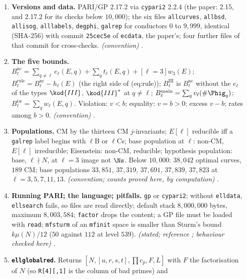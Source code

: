 \begin{enumerate}[label=\textbf{\thechapter.\arabic*}]
\item \textbf{Versions and data.} PARI/GP 2.17.2 via \texttt{cypari2} 2.2.4 (the paper: 2.15, and 2.17.2 for its checks below $10{,}000$); the six files
\texttt{allcurves}, \texttt{allbsd}, \texttt{allisog}, \texttt{alllabels}, \texttt{degphi}, \texttt{galrep} for conductors $0$ to $9{,}999$, identical (SHA-256) with commit
\texttt{25cec5e} of \texttt{ecdata}, the paper's; four further files of that commit for cross-checks. \emph{(convention)} .
\item \textbf{The five bounds.} $B^{\mathrm{nc}}_\ell=\sum_{q\ne\ell}e_\ell(E,q)+\sum_qt_\ell(E,q)+[\ell=3]w_3(E)$; $B^{\mathrm{rule}}_\ell=B^{\mathrm{nc}}_\ell-h_\ell(E)$ (the right side of (eq:rule));
$B^{\mathrm{III}}_\ell$ is $B^{\mathrm{nc}}_\ell$ without the $e_\ell$ of the types $\kod{III}$, $\kod{III}^*$ at $q\ne\ell$; $B^{\mathrm{main}}_\ell=\sum_qv_\ell(\#\Phig_q)$; $B^{\mathrm{tw}}_\ell=\sum_qw_\ell(E,q)$.
Violation: $v<b$; equality: $v=b>0$; excess $v-b$; rates among $b>0$. \emph{(convention)} .
\item \textbf{Populations.} CM by the thirteen CM $j$-invariants; $E[\ell]$ reducible iff a \texttt{galrep} label begins with $\ell$B or $\ell$Cs; base population at $\ell$:
non-CM, $E[\ell]$ irreducible; Eisenstein: non-CM, reducible; hypothesis population: base, $\ell\nmid N$, at $\ell=3$ image not $\Ns$. Below $10{,}000$: $38{,}042$ optimal
curves, $189$ CM; base populations $33{,}851$, $37{,}319$, $37{,}691$, $37{,}839$, $37{,}823$ at $\ell=3,5,7,11,13$. \emph{(convention; counts proved here, by computation)}
.
\item \textbf{Running PARI; the language; pitfalls.} \texttt{gp} or \texttt{cypari2}; without \texttt{elldata}, \texttt{ellsearch} fails, so files are read directly;
default stack $8{,}000{,}000$ bytes, maximum $8{,}003{,}584$; \texttt{factor} drops the content; a GP file must be loaded with \texttt{read};
\texttt{mfsturm} of an \texttt{mfinit} space is smaller than Sturm's bound $k\mu(N)/12$ ($50$ against $112$ at level $539$). \emph{(stated; reference
\cite{PARIusers}; behaviour checked here)} .
\item \textbf{\texttt{ellglobalred}.} Returns $[N,[u,r,s,t],\prod c_p,F,L]$ with $F$ the factorisation of $N$ (so \texttt{R[4][,1]} is the column of bad primes) and

\end{enumerate}
